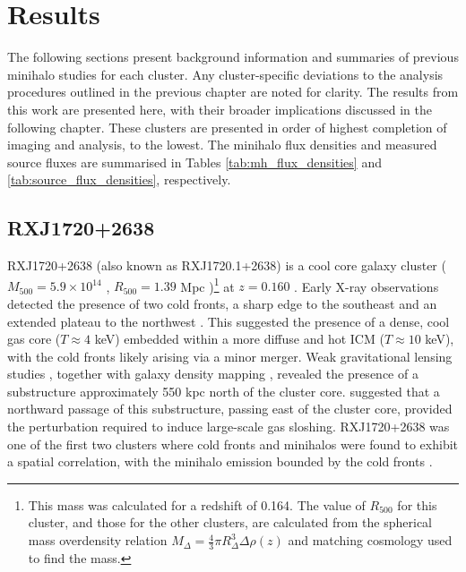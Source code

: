 \chapter[Results]{Results}
\label{Chap:Results}

The following sections present background information and summaries of previous minihalo studies for each cluster. Any cluster-specific deviations to the analysis procedures outlined in the previous chapter are noted for clarity. The results from this work are presented here, with their broader implications discussed in the following chapter. These clusters are presented in order of highest completion of imaging and analysis, to the lowest. The minihalo flux densities and measured source fluxes are summarised in Tables \ref{tab:mh_flux_densities} and \ref{tab:source_flux_densities}, respectively. 

\section{RXJ1720+2638}
\label{sec:rxj1720+2638}
RXJ1720+2638 (also known as RXJ1720.1+2638) is a cool core galaxy cluster ($M_{500}=5.9\times10^{14}$ \Msun{}, $R_{500}=1.39$ Mpc \citep{Planck2016})\footnote{This mass was calculated for a redshift of 0.164. The value of $R_{500}$ for this cluster, and those for the other clusters, are calculated from the spherical mass overdensity relation $M_{\Delta} = \frac43\pi R_\Delta^3\Delta\rho(z)$ and matching cosmology used to find the mass.} at $z = 0.160$ \citep{Owers2011}. Early X-ray observations detected the presence of two cold fronts, a sharp edge to the southeast and an extended plateau to the northwest \citep{Mazzotta2001}. This suggested the presence of a dense, cool gas core ($T \approx 4$ keV) embedded within a more diffuse and hot ICM ($T\approx10$ keV), with the cold fronts likely arising via a minor merger. Weak gravitational lensing studies \citep{Okabe2010}, together with galaxy density mapping \citep{Owers2011}, revealed the presence of a substructure approximately 550 kpc north of the cluster core. \citet{Owers2011} suggested that a northward passage of this substructure, passing east of the cluster core, provided the perturbation required to induce large-scale gas sloshing. RXJ1720+2638 was one of the first two clusters where cold fronts and minihalos were found to exhibit a spatial correlation, with the minihalo emission bounded by the cold fronts \citep{Mazotta2008}. 

